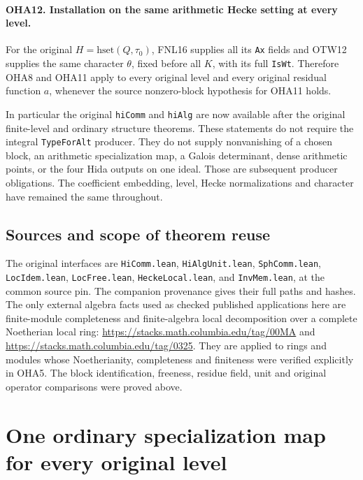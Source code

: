 \documentclass[11pt,a4paper]{article}
\numberwithin{equation}{section}
\theoremstyle{remark}\newtheorem{remark}[theorem]{Remark}
\begin{document}
\paragraph{OHA12. Installation on the same arithmetic Hecke setting at every level.}
\label{claim:OHA12}
For the original \(H=\mathrm{hset}(Q,\tau_0)\), FNL16 supplies
all its \texttt{Ax} fields and OTW12 supplies the same character
\(\theta\), fixed before all \(K\), with its full
\texttt{Is\allowbreak Wt}. Therefore OHA8 and OHA11 apply to every original
level and every original residual function \(a\), whenever the
source nonzero-block hypothesis for OHA11 holds.

In particular the original \texttt{hi\allowbreak Comm} and \texttt{hi\allowbreak Alg}
are now available after the original finite-level and ordinary
structure theorems. These statements do not require the
integral \texttt{Type\allowbreak For\allowbreak Alt} producer. They do not supply
nonvanishing of a chosen block, an arithmetic specialization
map, a Galois determinant, dense arithmetic points, or the
four Hida outputs on one ideal. Those are subsequent producer
obligations. The coefficient embedding, level, Hecke
normalizations and character have remained the same throughout.

\subsection{Sources and scope of theorem reuse}

The original interfaces are \texttt{Hi\allowbreak Comm.\allowbreak lean},
\texttt{Hi\allowbreak Alg\allowbreak Unit.\allowbreak lean}, \texttt{Sph\allowbreak Comm.\allowbreak lean},
\texttt{Loc\allowbreak Idem.\allowbreak lean}, \texttt{Loc\allowbreak Free.\allowbreak lean},
\texttt{Hecke\allowbreak Local.\allowbreak lean}, and \texttt{Inv\allowbreak Mem.\allowbreak lean}, at the common
source pin. The companion provenance gives their full paths and
hashes. The only external algebra facts used as checked published
applications here are finite-module completeness and finite-algebra
local decomposition over a complete Noetherian local ring:
\url{https://stacks.math.columbia.edu/tag/00MA} and
\url{https://stacks.math.columbia.edu/tag/0325}.
They are applied to rings and modules whose Noetherianity,
completeness and finiteness were verified explicitly in OHA5.
The block identification, freeness, residue field, unit and
original operator comparisons were proved above.


\section{One ordinary specialization map for every original level}
\label{sec:specialization-map-v42}
\end{document}
